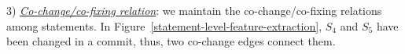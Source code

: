 
3) {\em \underline{Co-change/co-fixing relation}}: we maintain the
co-change/co-fixing relations among statements. In
Figure~\ref{statement-level-feature-extraction}, $S_4$ and
$S_5$ have been changed in a commit, thus, two co-change
edges connect them.



